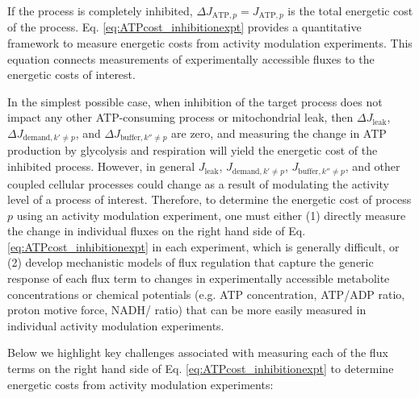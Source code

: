 \documentclass{compactarticle}
\begin{document}
\noindent If the process is completely inhibited, $\Delta J_{\text{ATP},p} = J_{\text{ATP},p}$ is the total energetic cost of the process. Eq. \ref{eq:ATPcost_inhibitionexpt} provides a quantitative framework to measure energetic costs from activity modulation experiments. This equation connects measurements of experimentally accessible fluxes to the energetic costs of interest.

In the simplest possible case, when inhibition of the target process does not impact any other ATP-consuming process or mitochondrial leak, then 
$ \Delta J_{\text{leak}}$, $ \Delta J_{\text{demand}, k' \neq p}$, and $ \Delta J_{\text{buffer}, k'' \neq p}$ are zero, and measuring the change in ATP production by glycolysis and respiration will yield the energetic cost of the inhibited process. However, in general $ J_{\text{leak}}$, $ J_{\text{demand}, k' \neq p}$, $ J_{\text{buffer}, k'' \neq p}$, and other coupled cellular processes could change as a result of modulating the activity level of a process of interest. Therefore, to determine the energetic cost of process $ p $ using an activity modulation experiment, one must either (1) directly measure the change in individual fluxes on the right hand side of Eq. \ref{eq:ATPcost_inhibitionexpt} in each experiment, which is generally difficult, or (2) develop mechanistic models of flux regulation that capture the generic response of each flux term to changes in experimentally accessible metabolite concentrations or chemical potentials (e.g. ATP concentration, ATP/ADP ratio, proton motive force, NADH/ ratio) that can be more easily measured in individual activity modulation experiments.

Below we highlight key challenges associated with measuring each of the flux terms on the right hand side of Eq. \ref{eq:ATPcost_inhibitionexpt} to determine energetic costs from activity modulation experiments:
\end{document}
